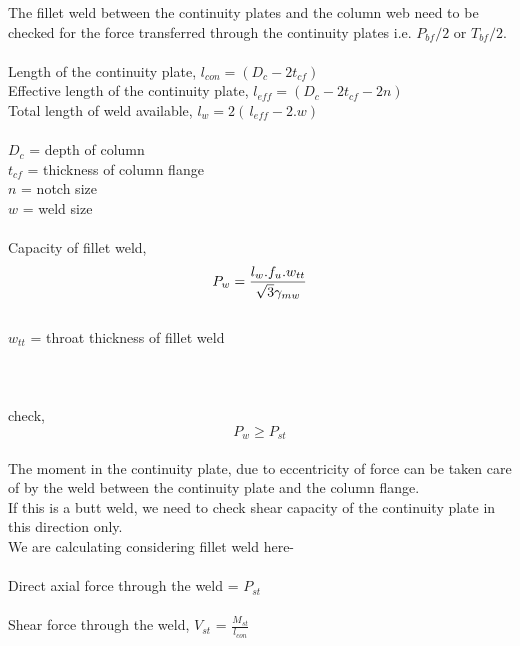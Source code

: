 \documentclass[11.5pt,a4paper,oneside]{report}
\begin{document}
\begin{Form}
The fillet weld between the continuity plates and the column web need to be checked for the force transferred through the continuity plates i.e. $P_{bf}/2$ \: or \: $T_{bf}/2$.\\
\\
Length of the continuity plate, $l_{con} = ( D_c - 2t_{cf} )$ \\
Effective length of the continuity plate, $l_{eff} = ( D_c - 2t_{cf} - 2n )$ \\
Total length of weld available, $l_w = 2(\, l_{eff} - 2.w)$ \\
\\
\indent $D_c$ = depth of column \\ 
\indent $t_{cf}$ = thickness of column flange \\
\indent $n$ = notch size \\
\indent $w$ = weld size \\
\\
Capacity of fillet weld,
\begin{equation}
P_w = \frac{l_w . f_u . w_{tt}}{\sqrt{3} \gamma_{mw}}\\
\end{equation}
\\
\indent $w_{tt}$ = throat thickness of fillet weld\\
\indent [Reference: Cl. 10.5.7 of IS 800: 2007] \\ \\
\\
check, 
\begin{equation}
P_w \ge P_{st}
\end{equation}
\\
The moment in the continuity plate, due to eccentricity of force can be taken care of by the weld between the continuity plate and the column flange. \\
If this is a butt weld, we need to check shear capacity of the continuity plate in this direction only.\\
We are calculating considering fillet weld here-\\
\\
Direct axial force through the weld = $P_{st}$\\
\\
Shear force through the weld, $V_{st}$ = $ \frac{M_{st}}{l_{con}} $ 
\\

\end{Form}
\end{document}
